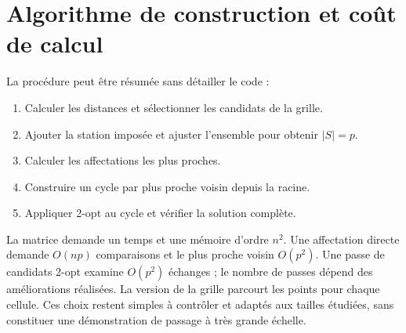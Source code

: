 \section{Algorithme de construction et coût de calcul}
La procédure peut être résumée sans détailler le code :
\begin{enumerate}
\item Calculer les distances et sélectionner les candidats de la grille.
\item Ajouter la station imposée et ajuster l'ensemble pour obtenir $|S|=p$.
\item Calculer les affectations les plus proches.
\item Construire un cycle par plus proche voisin depuis la racine.
\item Appliquer 2-opt au cycle et vérifier la solution complète.
\end{enumerate}
La matrice demande un temps et une mémoire d'ordre $n^2$. Une affectation
directe demande $O(np)$ comparaisons et le plus proche voisin $O(p^2)$.
Une passe de candidats 2-opt examine $O(p^2)$ échanges ; le nombre de passes
dépend des améliorations réalisées. La version de la grille parcourt les
points pour chaque cellule. Ces choix restent simples à contrôler et adaptés
aux tailles étudiées, sans constituer une démonstration de passage à très
grande échelle.

